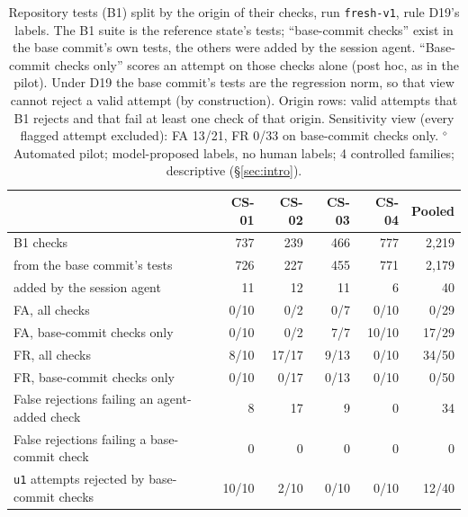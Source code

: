 \begin{table}[t]\centering\footnotesize
\caption{Repository tests (B1) split by the origin of their checks, run \texttt{fresh-v1}, rule D19's labels. The B1 suite is the reference state's tests; ``base-commit checks'' exist in the base commit's own tests, the others were added by the session agent. ``Base-commit checks only'' scores an attempt on those checks alone (post hoc, as in the pilot). Under D19 the base commit's tests are the regression norm, so that view cannot reject a valid attempt (by construction). Origin rows: valid attempts that B1 rejects and that fail at least one check of that origin. Sensitivity view (every flagged attempt excluded): FA 13/21, FR 0/33 on base-commit checks only. $^{\diamond}$Automated pilot; model-proposed labels, no human labels; 4 controlled families; descriptive (\S\ref{sec:intro}).}\label{tab:fresh-b1}
\begin{tabular}{lrrrrr}\toprule  & CS-01 & CS-02 & CS-03 & CS-04 & Pooled \\\midrule
B1 checks & 737 & 239 & 466 & 777 & 2{,}219 \\
\quad from the base commit's tests & 726 & 227 & 455 & 771 & 2{,}179 \\
\quad added by the session agent & 11 & 12 & 11 & 6 & 40 \\\midrule
FA, all checks & 0/10 & 0/2 & 0/7 & 0/10 & 0/29 \\
FA, base-commit checks only & 0/10 & 0/2 & 7/7 & 10/10 & 17/29 \\
FR, all checks & 8/10 & 17/17 & 9/13 & 0/10 & 34/50 \\
FR, base-commit checks only & 0/10 & 0/17 & 0/13 & 0/10 & 0/50 \\\midrule
False rejections failing an agent-added check & 8 & 17 & 9 & 0 & 34 \\
False rejections failing a base-commit check & 0 & 0 & 0 & 0 & 0 \\
\texttt{u1} attempts rejected by base-commit checks & 10/10 & 2/10 & 0/10 & 0/10 & 12/40 \\
\bottomrule\end{tabular}\end{table}
